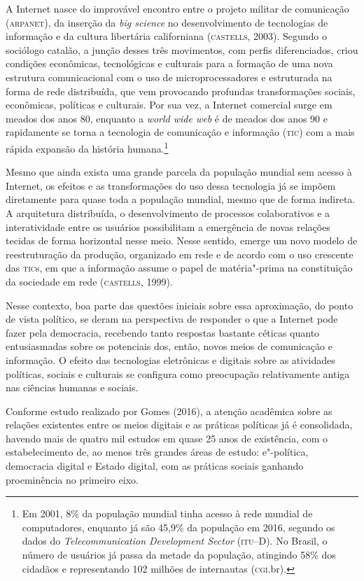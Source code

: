 \noindent{}A Internet nasce do improvável encontro entre o projeto militar de
comunicação (\textsc{arpanet}), da inserção da \textit{big science} no
desenvolvimento de tecnologias de informação e da cultura libertária
californiana (\textsc{castells}, 2003). Segundo o sociólogo catalão, a junção
desses três movimentos, com perfis diferenciados, criou condições
econômicas, tecnológicas e culturais para a formação de uma nova
estrutura comunicacional com o uso de microprocessadores e estruturada
na forma de rede distribuída, que vem provocando profundas
transformações sociais, econômicas, políticas e culturais. Por sua vez,
a Internet comercial surge em meados dos anos 80, enquanto a \textit{world
wide web} é de meados dos anos 90 e rapidamente se torna a tecnologia de
comunicação e informação (\textsc{tic}) com a mais rápida expansão da história
humana.\footnote{Em 2001, 8\% da população mundial tinha acesso à rede
  mundial de computadores, enquanto já são 45,9\% da população em 2016,
  segundo os dados do \textit{Telecommunication Development Sector}
  (\textsc{itu}--D). No Brasil, o número de usuários já passa da metade da
  população, atingindo 58\% dos cidadãos e representando 102 milhões de
  internautas (\textsc{cgi}.br).}

Mesmo que ainda exista uma grande parcela da população mundial sem
acesso à Internet, os efeitos e as transformações do uso dessa
tecnologia já se impõem diretamente para quase toda a população mundial,
mesmo que de forma indireta. A arquitetura distribuída, o
desenvolvimento de processos colaborativos e a interatividade entre os
usuários possibilitam a emergência de novas relações tecidas de forma
horizontal nesse meio. Nesse sentido, emerge um novo modelo de
reestruturação da produção, organizado em rede e de acordo com o uso
crescente das \textsc{tic}s, em que a informação assume o papel de matéria"-prima
na constituição da sociedade em rede (\textsc{castells}, 1999).

Nesse contexto, boa parte das questões iniciais sobre essa aproximação,
do ponto de vista político, se deram na perspectiva de responder o que a
Internet pode fazer pela democracia, recebendo tanto respostas bastante
céticas quanto entusiasmadas sobre os potenciais dos, então, novos meios
de comunicação e informação. O efeito das tecnologias eletrônicas e
digitais sobre as atividades políticas, sociais e culturais se configura
como preocupação relativamente antiga nas ciências humanas e sociais.

Conforme estudo realizado por Gomes (2016), a atenção acadêmica sobre as
relações existentes entre os meios digitais e as práticas políticas já é
consolidada, havendo mais de quatro mil estudos em quase 25 anos de
existência, com o estabelecimento de, ao menos três grandes áreas de
estudo: e"-política, democracia digital e Estado digital, com as práticas
sociais ganhando proeminência no primeiro eixo.

